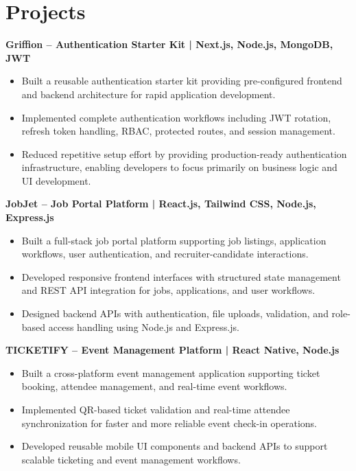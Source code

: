 \documentclass[a4paper,10pt]{article}
\begin{document}
    \section*{Projects}

\textbf{Griffion -- Authentication Starter Kit | Next.js, Node.js, MongoDB, JWT}

\begin{itemize}[leftmargin=*]
    \item Built a reusable authentication starter kit providing pre-configured frontend and backend architecture for rapid application development.
    
    \item Implemented complete authentication workflows including JWT rotation, refresh token handling, RBAC, protected routes, and session management.
    
    \item Reduced repetitive setup effort by providing production-ready authentication infrastructure, enabling developers to focus primarily on business logic and UI development.
\end{itemize}

\textbf{JobJet -- Job Portal Platform | React.js, Tailwind CSS, Node.js, Express.js}

\begin{itemize}[leftmargin=*]
    \item Built a full-stack job portal platform supporting job listings, application workflows, user authentication, and recruiter-candidate interactions.
    
    \item Developed responsive frontend interfaces with structured state management and REST API integration for jobs, applications, and user workflows.
    
    \item Designed backend APIs with authentication, file uploads, validation, and role-based access handling using Node.js and Express.js.
\end{itemize}

\textbf{TICKETIFY -- Event Management Platform | React Native, Node.js}

\begin{itemize}[leftmargin=*]
    \item Built a cross-platform event management application supporting ticket booking, attendee management, and real-time event workflows.
    
    \item Implemented QR-based ticket validation and real-time attendee synchronization for faster and more reliable event check-in operations.
    
    \item Developed reusable mobile UI components and backend APIs to support scalable ticketing and event management workflows.
\end{itemize}
\end{document}
